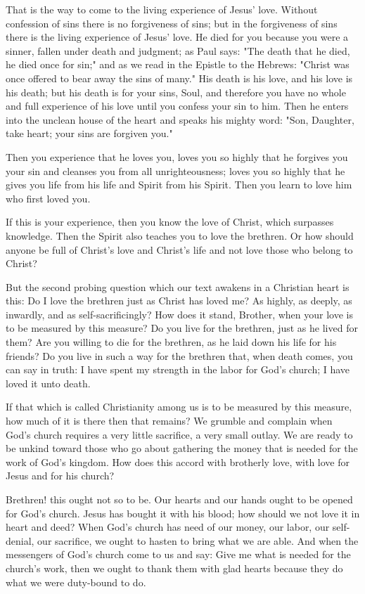 That is the way to come to the living experience of Jesus’ love. Without confession of sins there is no forgiveness of sins; but in the forgiveness of sins there is the living experience of Jesus’ love. He died for you because you were a sinner, fallen under death and judgment; as Paul says: "The death that he died, he died once for sin;" and as we read in the Epistle to the Hebrews: "Christ was once offered to bear away the sins of many." His death is his love, and his love is his death; but his death is for your sins, Soul, and therefore you have no whole and full experience of his love until you confess your sin to him. Then he enters into the unclean house of the heart and speaks his mighty word: "Son, Daughter, take heart; your sins are forgiven you."

Then you experience that he loves you, loves you so highly that he forgives you your sin and cleanses you from all unrighteousness; loves you so highly that he gives you life from his life and Spirit from his Spirit. Then you learn to love him who first loved you.

If this is your experience, then you know the love of Christ, which surpasses knowledge. Then the Spirit also teaches you to love the brethren. Or how should anyone be full of Christ’s love and Christ’s life and not love those who belong to Christ?

But the second probing question which our text awakens in a Christian heart is this: Do I love the brethren just as Christ has loved me? As highly, as deeply, as inwardly, and as self-sacrificingly? How does it stand, Brother, when your love is to be measured by this measure? Do you live for the brethren, just as he lived for them? Are you willing to die for the brethren, as he laid down his life for his friends? Do you live in such a way for the brethren that, when death comes, you can say in truth: I have spent my strength in the labor for God’s church; I have loved it unto death.

If that which is called Christianity among us is to be measured by this measure, how much of it is there then that remains? We grumble and complain when God’s church requires a very little sacrifice, a very small outlay. We are ready to be unkind toward those who go about gathering the money that is needed for the work of God’s kingdom. How does this accord with brotherly love, with love for Jesus and for his church?

Brethren! this ought not so to be. Our hearts and our hands ought to be opened for God’s church. Jesus has bought it with his blood; how should we not love it in heart and deed? When God’s church has need of our money, our labor, our self-denial, our sacrifice, we ought to hasten to bring what we are able. And when the messengers of God’s church come to us and say: Give me what is needed for the church’s work, then we ought to thank them with glad hearts because they do what we were duty-bound to do.

